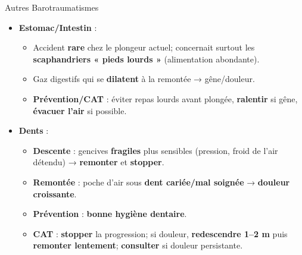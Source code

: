 \begin{frame}{Autres Barotraumatismes}
    \begin{itemize}
        \item \textbf{\textcolor{ffessmred}{Estomac/Intestin}} :
        \begin{itemize}
            \item Accident \textbf{rare} chez le plongeur actuel; concernait surtout les \textbf{scaphandriers « pieds lourds »} (alimentation abondante).
            \item Gaz digestifs qui se \textbf{dilatent} à la remontée → gêne/douleur.
            \item \textbf{Prévention/CAT} : éviter repas lourds avant plongée, \textbf{ralentir} si gêne, \textbf{évacuer l'air} si possible.
        \end{itemize}

        \vspace{0.4em}
        \item \textbf{\textcolor{ffessmred}{Dents}} :
        \begin{itemize}
            \item \textbf{Descente} : gencives \textbf{fragiles} plus sensibles (pression, froid de l'air détendu) → \textbf{remonter} et \textbf{stopper}.
            \item \textbf{Remontée} : poche d'air sous \textbf{dent cariée/mal soignée} → \textbf{douleur croissante}.
            \item \textbf{Prévention} : \textbf{bonne hygiène dentaire}.
            \item \textbf{CAT} : \textbf{stopper} la progression; si douleur, \textbf{redescendre 1–2 m} puis \textbf{remonter lentement}; \textbf{consulter} si douleur persistante.
        \end{itemize}
    \end{itemize}
\end{frame}

